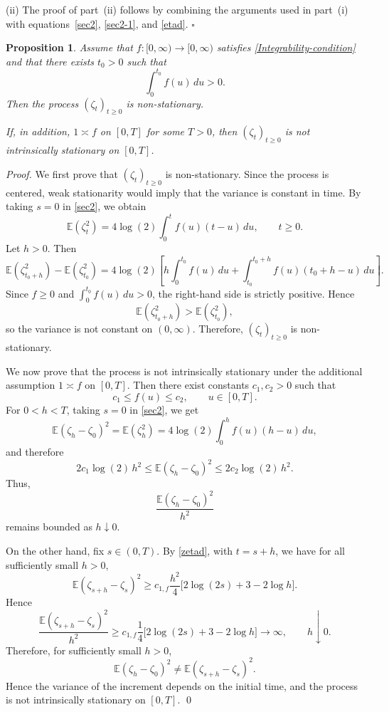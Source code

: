 \documentclass[preprint,12pt,authoryear]{elsarticle}
\def\E{\mathbb{E}}
\newtheorem{prop}{Proposition}
\begin{document}
(ii) The proof of part~(ii) follows by combining the arguments used in part~(i) with equations~\eqref{sec2}, \eqref{sec2-1}, and \eqref{etad}.
\hfill\(\square\)
\begin{prop}\label{prop:nonstat_intrinsic}
Assume that \(f:[0,\infty)\to[0,\infty)\) satisfies \eqref{Integrability-condition} and that there exists \(t_0>0\) such that
\[
\int_0^{t_0} f(u)\,du>0.
\]
Then the process \((\zeta_t)_{t\ge0}\) is non-stationary.

If, in addition, \(1\asymp f\) on \([0,T]\) for some \(T>0\), then \((\zeta_t)_{t\ge0}\) is not intrinsically stationary on \([0,T]\).
\end{prop}

\begin{proof}
We first prove that \((\zeta_t)_{t\ge0}\) is non-stationary. Since the process is centered, weak stationarity would imply that the variance is constant in time. By taking \(s=0\) in \eqref{sec2}, we obtain
\[
\E(\zeta_t^2)=4\log(2)\int_0^t f(u)(t-u)\,du,\qquad t\ge0.
\]
Let \(h>0\). Then
\[
\E(\zeta_{t_0+h}^2)-\E(\zeta_{t_0}^2)
=
4\log(2)\left[
h\int_0^{t_0} f(u)\,du+\int_{t_0}^{t_0+h} f(u)(t_0+h-u)\,du
\right].
\]
Since \(f\ge0\) and \(\int_0^{t_0} f(u)\,du>0\), the right-hand side is strictly positive. Hence
\[
\E(\zeta_{t_0+h}^2)>\E(\zeta_{t_0}^2),
\]
so the variance is not constant on \((0,\infty)\). Therefore, \((\zeta_t)_{t\ge0}\) is non-stationary.

We now prove that the process is not intrinsically stationary under the additional assumption \(1\asymp f\) on \([0,T]\). Then there exist constants \(c_1,c_2>0\) such that
\[
c_1\le f(u)\le c_2,\qquad u\in[0,T].
\]
For \(0<h<T\), taking \(s=0\) in \eqref{sec2}, we get
\[
\E(\zeta_h-\zeta_0)^2=\E(\zeta_h^2)=4\log(2)\int_0^h f(u)(h-u)\,du,
\]
and therefore
\[
2c_1\log(2)\,h^2
\le
\E(\zeta_h-\zeta_0)^2
\le
2c_2\log(2)\,h^2.
\]
Thus,
\[
\frac{\E(\zeta_h-\zeta_0)^2}{h^2}
\]
remains bounded as \(h\downarrow0\).

On the other hand, fix \(s\in(0,T)\). By \eqref{zetad}, with \(t=s+h\), we have for all sufficiently small \(h>0\),
\[
\E(\zeta_{s+h}-\zeta_s)^2
\ge
c_{1,f}\frac{h^2}{4}\bigl[2\log(2s)+3-2\log h\bigr].
\]
Hence
\[
\frac{\E(\zeta_{s+h}-\zeta_s)^2}{h^2}
\ge
c_{1,f}\frac{1}{4}\bigl[2\log(2s)+3-2\log h\bigr]
\longrightarrow \infty,
\qquad h\downarrow0.
\]
Therefore, for sufficiently small \(h>0\),
\[
\E(\zeta_h-\zeta_0)^2 \neq \E(\zeta_{s+h}-\zeta_s)^2.
\]
Hence the variance of the increment depends on the initial time, and the process is not intrinsically stationary on \([0,T]\). \qed
\end{proof}
\end{document}
